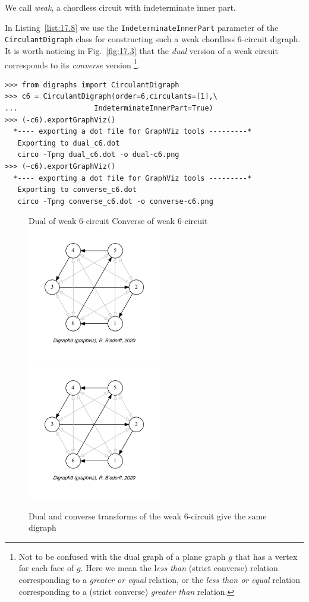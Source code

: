 We call \emph{weak}, a chordless circuit with indeterminate inner part.

In Listing~\vref{list:17.8} we use the \texttt{IndeterminateInnerPart} parameter of the \texttt{Cir\-culantDigraph} class for constructing such a weak chordless 6-circuit digraph. It is worth noticing in Fig.~\vref{fig:17.3} that the \emph{dual} version of a weak circuit corresponds to its \emph{converse} version \footnote{Not to be confused with the dual graph of a plane graph $g$ that has a vertex for each face of $g$. Here we mean the l\emph{ess than} (strict converse) relation corresponding to a \emph{greater or equal} relation, or the \emph{less than or equal} relation corresponding to a (strict converse) \emph{greater than} relation.}.
\begin{lstlisting}[caption={The weak 6-circuit digraph},label=list:17.8]
>>> from digraphs import CirculantDigraph
>>> c6 = CirculantDigraph(order=6,circulants=[1],\
...                  IndeterminateInnerPart=True)
>>> (-c6).exportGraphViz()
  *---- exporting a dot file for GraphViz tools ---------*
   Exporting to dual_c6.dot
   circo -Tpng dual_c6.dot -o dual-c6.png
>>> (~c6).exportGraphViz()
  *---- exporting a dot file for GraphViz tools ---------*
   Exporting to converse_c6.dot
   circo -Tpng converse_c6.dot -o converse-c6.png 
\end{lstlisting}
\begin{figure}[ht]
  Dual of weak 6-circuit \hfill Converse of weak 6-circuit\\
  \includegraphics[height=6cm]{Figures/17-3-dual-c6.pdf}\hfill
  \includegraphics[height=6cm]{Figures/17-3-converse-c6.pdf}
\caption[Dual and converse transforms of the weak 6-circuit]{Dual and converse transforms of the weak 6-circuit give the same digraph}
\label{fig:17.3}       %
\end{figure}

